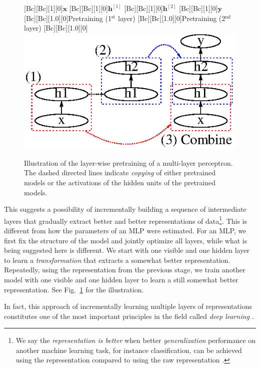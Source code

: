 \documentclass[dissertation,nocontribution,draft*]{aaltoseries}
\newcommand{\qlay}[1]{\left[#1\right]}
\newcommand{\vect}[1]{\mathbf{#1}}
\newcommand{\vh}[0]{\vect{h}}
\newcommand{\vx}[0]{\vect{x}}
\newcommand{\vy}[0]{\vect{y}}
\begin{document}
\begin{figure}[t]
    \centering
    [Bc][Bc][1][0]{$\vx$}
    [Bc][Bc][1][0]{$\vh^{\qlay{1}}$}
    [Bc][Bc][1][0]{$\vh^{\qlay{2}}$}
    [Bc][Bc][1][0]{$\vy$}
    [Bc][Bc][1.0][0]{Pretraining
    (1$^\text{st}$ layer)}
    [Bc][Bc][1.0][0]{Pretraining
    (2$^\text{nd}$ layer)}
    [Bc][Bc][1.0][0]{}
    \includegraphics[width=0.7\columnwidth]{figures/pretrain_mlp.eps}
    \caption{Illustration of the layer-wise pretraining of
    a multi-layer perceptron. The dashed directed lines
    indicate \textit{copying} of either pretrained models or
    the activations of the hidden units of the pretrained
    models.}
    \label{fig:incr_feat}
\end{figure}

This suggests a possibility of incrementally building a
sequence of intermediate layers that gradually extract
better and better representations of data\footnote{We say
the \textit{representation is better} when better
\textit{generalization} performance on another machine
learning task, for instance classification, can be achieved
using the representation compared to using the raw
representation \citep{Bengio2007nips}.}. This is different
from
how the parameters of an MLP were estimated. For an MLP, we
first fix the structure of the model and jointly optimize
all layers, while what is being suggested here is different. We start with one visible and one hidden
layer to learn a \textit{transformation} that extracts a
somewhat better representation. Repeatedly, using the
representation from the previous stage, we train another
model with one visible and one hidden layer to learn a
still somewhat
better representation. See Fig.~\ref{fig:incr_feat}
for the illustration.

In fact, this approach of incrementally learning multiple
layers of representations constitutes one of the most important
principles in the field called \textit{deep learning}
\citep[see, e.g.,][]{Bengio2009a}.
\end{document}
